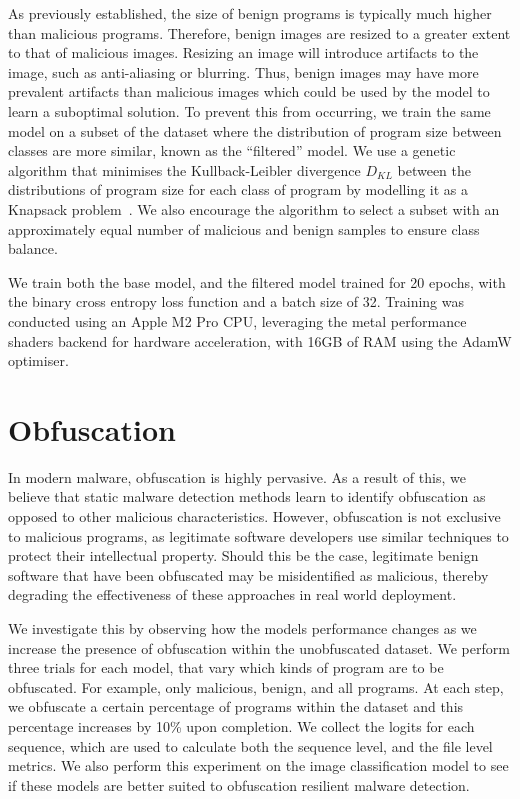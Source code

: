 \documentclass[main.tex]{subfiles}
\begin{document}
As previously established, the size of benign programs is typically much higher than malicious programs. Therefore, benign images are resized to a greater extent to that of malicious images. Resizing an image will introduce artifacts to the image, such as anti-aliasing or blurring. Thus, benign images may have more prevalent artifacts than malicious images which could be used by the model to learn a suboptimal solution. To prevent this from occurring, we train the same model on a subset of the dataset where the distribution of program size between classes are more similar, known as the ``filtered'' model. We use a genetic algorithm that minimises the Kullback-Leibler divergence $D_{KL}$ between the distributions of program size for each class of program by modelling it as a Knapsack problem~\citep{khuriZeroOneMultiple1994}. We also encourage the algorithm to select a subset with an approximately equal number of malicious and benign samples to ensure class balance. 

We train both the base model, and the filtered model trained for 20 epochs, with the binary cross entropy loss function and a batch size of 32. Training was conducted using an Apple M2 Pro CPU, leveraging the metal performance shaders backend for hardware acceleration, with 16GB of RAM using the AdamW optimiser. 

\section{Obfuscation}

In modern malware, obfuscation is highly pervasive. As a result of this, we believe that static malware detection methods learn to identify obfuscation as opposed to other malicious characteristics. However, obfuscation is not exclusive to malicious programs, as legitimate software developers use similar techniques to protect their intellectual property. Should this be the case, legitimate benign software that have been obfuscated may be misidentified as malicious, thereby degrading the effectiveness of these approaches in real world deployment. 

We investigate this by observing how the models performance changes as we increase the presence of obfuscation within the unobfuscated dataset. We perform three trials for each model, that vary which kinds of program are to be obfuscated. For example, only malicious, benign, and all programs. At each step, we obfuscate a certain percentage of programs within the dataset and this percentage increases by 10\% upon completion. We collect the logits for each sequence, which are used to calculate both the sequence level, and the file level metrics. We also perform this experiment on the image classification model to see if these models are better suited to obfuscation resilient malware detection.
\end{document}
